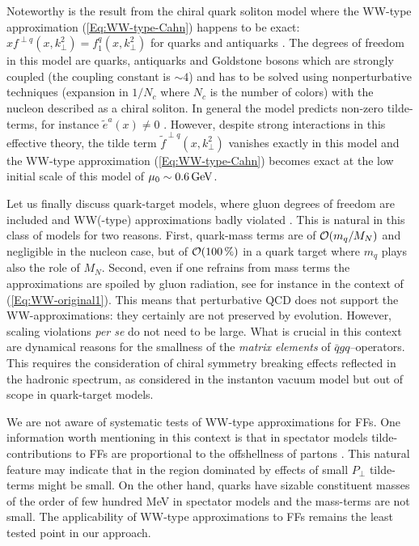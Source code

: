 \documentclass[a4paper,11pt]{article}
\newcommand{\blue}[1]{{\color{blue} #1}}
\newcommand{\ps}[1]{\blue{ #1}}
\def\kperp{k_\perp}
\begin{document}
\ps{Noteworthy is the result from the chiral quark soliton
model where the WW-type approximation (\ref{Eq:WW-type-Cahn})
happens to be exact: $xf^{\perp q}(x,\kperp^2)=f_{1}^q(x,\kperp^2)$
for quarks and antiquarks \cite{Lorce:2014hxa}. The degrees of freedom
in this model are quarks, antiquarks and Goldstone bosons which are 
strongly coupled (the coupling constant is $\sim 4$) and has to be
solved using nonperturbative techniques (expansion in $1/N_c$ where
$N_c$ is the number of colors) with the nucleon described as a 
chiral soliton. In general the model predicts non-zero tilde-terms, for 
instance $\tilde{e}^a(x)\neq 0$ 
\cite{Schweitzer:2003uy,Ohnishi:2003mf,Cebulla:2007ej}.
However, despite strong interactions in this effective theory, the tilde 
term $\tilde{f}^{\perp q}(x,\kperp^2)$ vanishes exactly in this model 
\cite{Lorce:2014hxa} and the WW-type approximation (\ref{Eq:WW-type-Cahn})
becomes exact at the low initial scale of this model of 
$\mu_0\sim 0.6\,{\rm GeV}$.}

Let us finally discuss quark-target models, 
where gluon degrees of freedom are included and WW(-type)
approximations badly violated
\cite{Kundu:2001pk,Schlegel:2004rg,Meissner:2007rx,Mukherjee:2009uy}.
This is natural in this class of models for two
reasons. First, quark-mass terms are of ${\cal O}(m_q/M_N)$ 
and negligible in the nucleon case, but of ${\cal O}(100\,\%)$
in a quark target where $m_q$ plays also the role of $M_N$. 
Second, even if one refrains from mass terms the approximations are 
spoiled by gluon radiation, see for instance \cite{Harindranath:1997qn} 
in the context of (\ref{Eq:WW-original1}).
This means that perturbative QCD does not support the WW-approximations:
they certainly are not preserved by evolution. However, scaling violations
{\it per se} do not need to be large. What is crucial in this context are 
dynamical reasons for the smallness of the {\sl matrix elements} of
$\bar qgq$--operators. This requires the consideration of chiral symmetry 
breaking effects reflected in the hadronic spectrum, as considered in the
instanton vacuum model \cite{Balla:1997hf,Dressler:1999hc} but 
out of scope in quark-target models.

We are not aware of systematic tests of WW-type approximations for FFs. One 
information worth mentioning in this context is that in spectator models 
\cite{Jakob:1997wg} tilde-contributions to FFs are proportional to the 
offshellness of partons %
\cite{Lorce:2014hxa,Lorce:2016ugb}. This
natural feature may indicate that in the region dominated by effects of
small $P_\perp$ tilde-terms might be small. On the other hand, quarks have 
sizable constituent masses of the order of few hundred MeV in spectator models 
and the mass-terms are not small. 
The applicability of WW-type approximations to FFs 
remains the least tested point in our approach.
\end{document}
